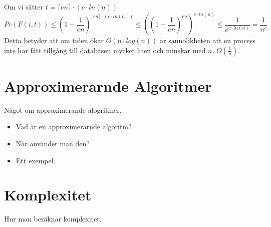 \documentclass[a4paper]{report}
\begin{document}
Om vi sätter $t = \lceil{}en\rceil \cdot (c\cdot{}ln(n))$
\begin{equation}
	Pr(F(i,t)) \leq (1 - \frac{1}{en})^{\lceil{}en\rceil \cdot (c\cdot{}ln(n))}
	\leq ((1 - \frac{1}{en})^{en})^{c\cdot{}ln(n)} \leq
	\frac{1}{e^{c\cdot{}ln(n)}} = \frac{1}{n^c}
\end{equation}
Detta betyder att om tiden ökar $O(n\cdot{}log(n))$ är sannolikheten att en
process inte har fått tillgång till databasen mycket liten och minskar med $n$,
$O(\frac{1}{n})$.


\section{Approximerarnde Algoritmer}

Något om approximerande alogritmer.
\begin{itemize}
	\item Vad är en approximerarnde algoritm?
	\item När använder man den?
	\item Ett exempel.
\end{itemize}

\section{Komplexitet}
Hur man beräknar komplexitet.
\end{document}
